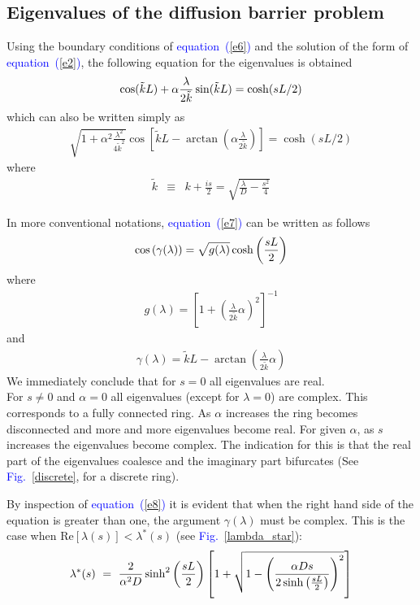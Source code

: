 \documentclass[aps,pre,floats,floatfix,fleqn,notitlepage]{revtex4-1}
\newcommand{\mylabel}[1]{\label{#1}}  %
\newcommand{\beq}{\begin{eqnarray}}
\newcommand{\eeq}{\end{eqnarray}}
\newcommand{\be}[1]{\begin{eqnarray}\ifthenelse{#1=-1}{\nonumber}{\ifthenelse{#1=0}{}{\mylabel{e#1}}}}
\newcommand{\ee}{\end{eqnarray}}
\newcommand{\Eq}[1]{\textcolor{blue}{equation~(\ref{#1})}} %
\newcommand{\Fig}[1] {\textcolor{blue}{Fig.~\ref{#1}}} %
\begin{document}
\subsection{Eigenvalues of the diffusion barrier problem}
Using the boundary conditions of \Eq{e6} and the solution of the form of \Eq{e2}, 
the following equation for the eigenvalues is obtained
%
\be{7}
\cos(\tilde{k}L) + \alpha \frac{\lambda}{2\tilde{k}}\sin(\tilde{k}L) = \cosh(sL/2)
\ee
%
which can also be written simply as 
%
\beq
\sqrt{1+\alpha^2\frac{\lambda^2}{4\tilde{k}^2}} \cos \left[ \tilde{k}L - \arctan \left(\alpha\frac{ \lambda}{2\tilde{k}}\right)\right] = \cosh(sL/2)
\eeq
%
where  
\beq
\tilde{k} &\equiv & k + \frac{is}{2} =  \sqrt{\frac{\lambda}{D}-\frac{s^2}{4}} 
\eeq
%

%

In more conventional notations, \Eq{e7} can be written as follows
%
\be{8}
\cos\left( \gamma(\lambda)\right) = \sqrt{g(\lambda)} \cosh\left(\frac{sL}{2}\right)
\ee
%
where
%
\beq
g(\lambda) = \left[1+\left(\frac{\lambda}{2\tilde{k}}\alpha\right)^2\right]^{-1}
\eeq
%
and 
%
\beq
\gamma(\lambda) =  \tilde{k}L - \arctan \left(\frac{ \lambda}{2\tilde{k}}\alpha\right) 
\eeq
%
We immediately conclude that for $s=0$ all eigenvalues are real. \\
For $s\neq0$ and $\alpha=0$ all eigenvalues (except for $\lambda=0$) are complex. This corresponds to a fully connected ring.
As $\alpha$ increases the ring becomes disconnected and more and more eigenvalues become real. 
%
For given $\alpha$, as $s$ increases the eigenvalues become complex. The indication for this 
is that the real part of the eigenvalues coalesce and the imaginary part bifurcates (See \Fig{discrete}, for a discrete ring).


By inspection of \Eq{e8} it is evident that 
when the right hand side of the equation is greater than one,
the argument $\gamma(\lambda)$ must be complex.
%
This is the case when $\mbox{Re}[\lambda(s)] < \lambda^*(s)$ (see \Fig{lambda_star}):
%
\be{19}
\lambda^* (s) \ = \ \frac{2}{\alpha^2 D} \sinh^2\left(\frac{sL}{2}\right) \left[1+ \sqrt{1 - \left(\frac{\alpha Ds}{2\sinh\left(\frac{sL}{2}\right)}\right)^2} \right]
\ee
\end{document}

